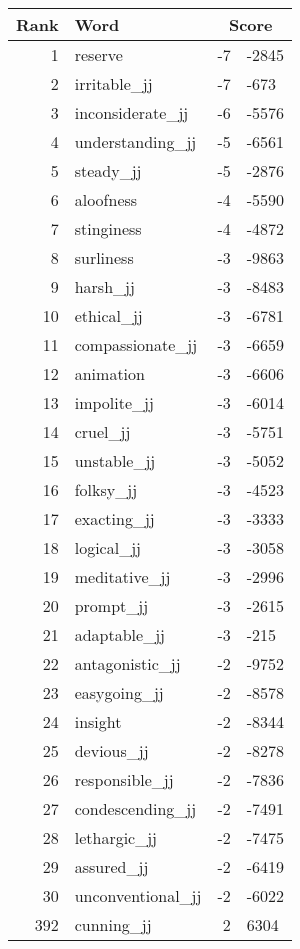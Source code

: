 \begin{longtable}[!htbp]{| rlr@{.}l |}
    \hline
    \textbf{Rank} & \textbf{Word} & \multicolumn{2}{c|}{\textbf{Score}} \\
    \hline
    \endhead
    1 & reserve & -7 & -2845 \\
    2 & irritable\_jj & -7 & -673 \\
    3 & inconsiderate\_jj & -6 & -5576 \\
    4 & understanding\_jj & -5 & -6561 \\
    5 & steady\_jj & -5 & -2876 \\
    6 & aloofness & -4 & -5590 \\
    7 & stinginess & -4 & -4872 \\
    8 & surliness & -3 & -9863 \\
    9 & harsh\_jj & -3 & -8483 \\
    10 & ethical\_jj & -3 & -6781 \\
    11 & compassionate\_jj & -3 & -6659 \\
    12 & animation & -3 & -6606 \\
    13 & impolite\_jj & -3 & -6014 \\
    14 & cruel\_jj & -3 & -5751 \\
    15 & unstable\_jj & -3 & -5052 \\
    16 & folksy\_jj & -3 & -4523 \\
    17 & exacting\_jj & -3 & -3333 \\
    18 & logical\_jj & -3 & -3058 \\
    19 & meditative\_jj & -3 & -2996 \\
    20 & prompt\_jj & -3 & -2615 \\
    21 & adaptable\_jj & -3 & -215 \\
    22 & antagonistic\_jj & -2 & -9752 \\
    23 & easygoing\_jj & -2 & -8578 \\
    24 & insight & -2 & -8344 \\
    25 & devious\_jj & -2 & -8278 \\
    26 & responsible\_jj & -2 & -7836 \\
    27 & condescending\_jj & -2 & -7491 \\
    28 & lethargic\_jj & -2 & -7475 \\
    29 & assured\_jj & -2 & -6419 \\
    30 & unconventional\_jj & -2 & -6022 \\
    392 & cunning\_jj & 2 & 6304 \\

\end{longtable}
